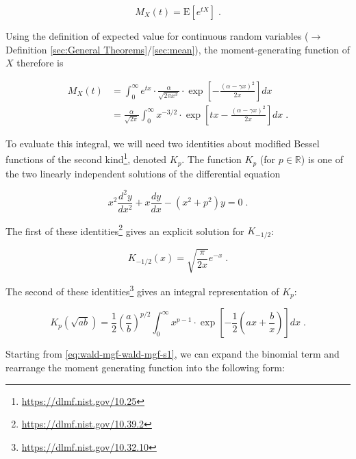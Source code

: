 \documentclass[a4paper,12pt,twoside]{book}
\begin{document}
\begin{equation} \label{eq:wald-mgf-mgf-var}
M_X(t) = \mathrm{E} \left[ e^{tX} \right] \; .
\end{equation}

Using the definition of expected value for continuous random variables ($\rightarrow$ Definition \ref{sec:General Theorems}/\ref{sec:mean}), the moment-generating function of $X$ therefore is

\begin{equation} \label{eq:wald-mgf-wald-mgf-s1}
\begin{split}
M_X(t) &= \int_0^{\infty} e^{tx} \cdot \frac{\alpha}{\sqrt{2\pi x^3}}\cdot \exp\left[-\frac{(\alpha-\gamma x)^2}{2x}\right]dx \\
&= \frac{\alpha}{\sqrt{2\pi}}\int_0^{\infty} x^{-3/2}\cdot \exp\left[tx - \frac{(\alpha-\gamma x)^2}{2x}\right]dx \; .
\end{split}
\end{equation}

To evaluate this integral, we will need two identities about modified Bessel functions of the second kind\footnote{\url{https://dlmf.nist.gov/10.25}}, denoted $K_{p}$. The function $K_{p}$ (for $p\in \mathbb{R}$) is one of the two linearly independent solutions of the differential equation

\begin{equation} \label{eq:wald-mgf-bessel-de}
x^2\frac{d^2y}{dx^2} + x\frac{dy}{dx}-(x^2+p^2)y=0 \; .
\end{equation}

The first of these identities\footnote{\url{https://dlmf.nist.gov/10.39.2}} gives an explicit solution for $K_{-1/2}$:

\begin{equation} \label{eq:wald-mgf-bessel-fact1}
K_{-1/2}(x) = \sqrt{\frac{\pi}{2x}} e^{-x} \; .
\end{equation}

The second of these identities\footnote{\url{https://dlmf.nist.gov/10.32.10}} gives an integral representation of $K_p$:

\begin{equation} \label{eq:wald-mgf-bessel-fact2}
K_p(\sqrt{ab}) = \frac{1}{2}\left(\frac{a}{b}\right)^{p/2} \int_0^{\infty}x^{p-1}\cdot \exp\left[-\frac{1}{2}\left(ax + \frac{b}{x}\right)\right]dx \; .
\end{equation}

Starting from \eqref{eq:wald-mgf-wald-mgf-s1}, we can expand the binomial term and rearrange the moment generating function into the following form:
\end{document}
